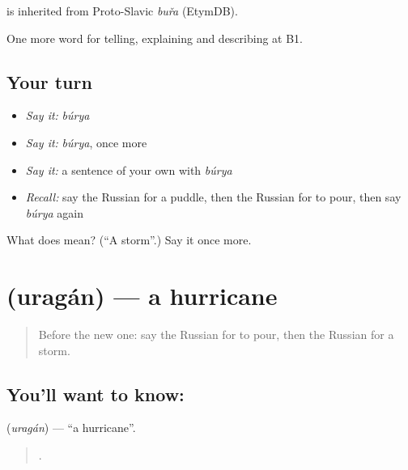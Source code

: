 \begin{cousinweb}
\emph{} is inherited from Proto-Slavic \emph{buřa} (EtymDB).
\end{cousinweb}

\begin{grammarlens}[title={What you've built}]
One more word for telling, explaining and describing at B1.
\end{grammarlens}

\subsection*{Your turn}
\begin{itemize}
\raggedright
  \item \emph{Say it:} \emph{búrya}
  \item \emph{Say it:} \emph{búrya}, once more
  \item \emph{Say it:} a sentence of your own with \emph{búrya}
  \item \emph{Recall:} say the Russian for a puddle, then the Russian for to pour, then say \emph{búrya} again
\end{itemize}

\begin{tcolorbox}[breakable,colback=teal!4,colframe=teal!35!black,title={Before you move on}]
What does  mean? (\textquotedblleft{}A storm\textquotedblright{}.) Say it once more.
\end{tcolorbox}
\section[\texorpdfstring{\ru{ураган} (uragán)}{ураган (uragán)}]{ (uragán) — a hurricane}

\label{lesson:RU-C466-uragan}



\begin{quote}
Before the new one: say the Russian for to pour, then the Russian for a storm.
\end{quote}

\subsection*{You'll want to know: }
\textbf{} (\emph{uragán}) — \textquotedblleft{}a hurricane\textquotedblright{}.

\begin{quote}
   .
\end{quote}

